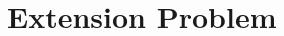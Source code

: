 \documentclass{article}
\begin{document}
\newpage

\section{Extension Problem}

\newpage




\begin{thebibliography}{1}



\end{thebibliography}
\end{document}
